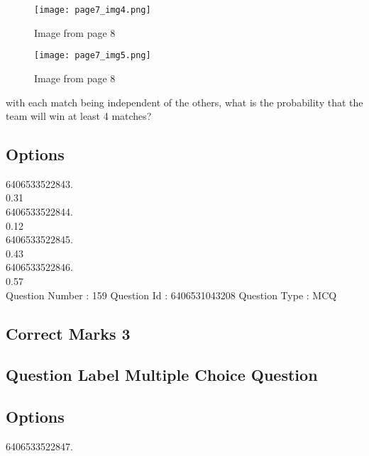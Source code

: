 \documentclass{article}
\begin{document}
\begin{figure}[h]
\centering
\texttt{[image: page7\_img4.png]}
\caption{Image from page 8}
\end{figure}

\begin{figure}[h]
\centering
\texttt{[image: page7\_img5.png]}
\caption{Image from page 8}
\end{figure}

with each match being independent of the others, what is the probability that the team will win at 
least 4 matches?\\

\subsection{Options }

6406533522843.\\

0.31\\

6406533522844.\\

0.12\\

6406533522845.\\

0.43\\

6406533522846.\\

0.57\\

Question Number : 159 Question Id : 6406531043208 Question Type : MCQ\\

\subsection{Correct Marks  3}

\subsection{Question Label  Multiple Choice Question}

\subsection{Options }

6406533522847.\\
\end{document}
